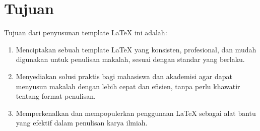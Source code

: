 %
%
\section{Tujuan}

Tujuan dari penyusunan template LaTeX ini adalah:

\begin{enumerate}
    \item Menciptakan sebuah template LaTeX yang konsisten, profesional, dan mudah digunakan untuk penulisan makalah, sesuai dengan standar yang berlaku.
    \item Menyediakan solusi praktis bagi mahasiswa dan akademisi agar dapat menyusun makalah dengan lebih cepat dan efisien, tanpa perlu khawatir tentang format penulisan.
    \item Memperkenalkan dan mempopulerkan penggunaan LaTeX sebagai alat bantu yang efektif dalam penulisan karya ilmiah.
\end{enumerate}

%
%
